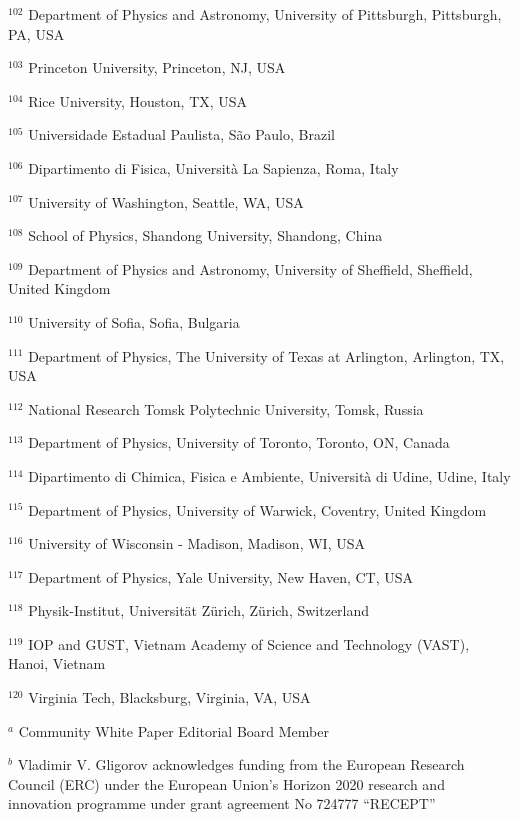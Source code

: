 \par {\footnotesize $^{102}$ Department of Physics and Astronomy, University of Pittsburgh, Pittsburgh, PA, USA}
\par {\footnotesize $^{103}$ Princeton University, Princeton, NJ, USA}
\par {\footnotesize $^{104}$ Rice University, Houston, TX, USA}
\par {\footnotesize $^{105}$ Universidade Estadual Paulista, São Paulo, Brazil}
\par {\footnotesize $^{106}$ Dipartimento di Fisica, Università La Sapienza, Roma, Italy}
\par {\footnotesize $^{107}$ University of Washington, Seattle, WA, USA}
\par {\footnotesize $^{108}$ School of Physics, Shandong University, Shandong, China}
\par {\footnotesize $^{109}$ Department of Physics and Astronomy, University of Sheffield, Sheffield, United Kingdom}
\par {\footnotesize $^{110}$ University of Sofia, Sofia, Bulgaria}
\par {\footnotesize $^{111}$ Department of Physics, The University of Texas at Arlington, Arlington, TX, USA}
\par {\footnotesize $^{112}$ National Research Tomsk Polytechnic University, Tomsk, Russia}
\par {\footnotesize $^{113}$ Department of Physics, University of Toronto, Toronto, ON, Canada}
\par {\footnotesize $^{114}$ Dipartimento di Chimica, Fisica e Ambiente, Università di Udine, Udine, Italy}
\par {\footnotesize $^{115}$ Department of Physics, University of Warwick, Coventry, United Kingdom}
\par {\footnotesize $^{116}$ University of Wisconsin - Madison, Madison, WI, USA}
\par {\footnotesize $^{117}$ Department of Physics, Yale University, New Haven, CT, USA}
\par {\footnotesize $^{118}$ Physik-Institut, Universität Zürich, Zürich, Switzerland}
\par {\footnotesize $^{119}$ IOP and GUST, Vietnam Academy of Science and Technology (VAST), Hanoi, Vietnam}
\par {\footnotesize $^{120}$ Virginia Tech, Blacksburg, Virginia, VA, USA}
\bigskip
\par {\footnotesize $^{a}$ Community White Paper Editorial Board Member}
\par {\footnotesize $^{b}$ Vladimir V. Gligorov acknowledges funding from the European Research Council (ERC) under the European Union's Horizon 2020 research and innovation programme under grant agreement No 724777 “RECEPT”}
